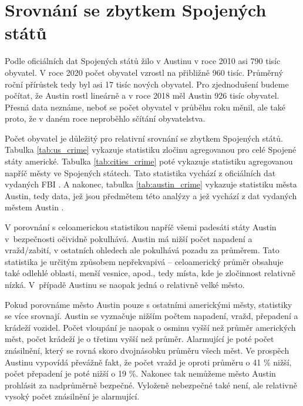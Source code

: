 \documentclass{article}
\begin{document}
\clearpage

\section{Srovnání se zbytkem Spojených států}

Podle oficiálních dat Spojených států \cite{austin-census} žilo v Austinu v roce 2010 asi 790 tisíc obyvatel.
V roce 2020 počet obyvatel vzrostl na přibližně 960 tisíc. Průměrný roční přírůstek tedy byl asi 17 tisíc
nových obyvatel. Pro zjednodušení budeme počítat, že Austin rostl lineárně a v roce 2018 měl Austin 926 tisíc
obyvatel. Přesná data neznáme, neboť se počet obyvatel v průběhu roku měnil, ale také proto, že v daném roce
neproběhlo sčítání obyvatelstva.

Počet obyvatel je důležitý pro relativní srovnání se zbytkem Spojených států. Tabulka \ref{tab:us_crime}
vykazuje statistiku zločinu agregovanou pro celé Spojené státy americké. Tabulka \ref{tab:cities_crime} 
poté vykazuje statistiku agregovanou napříč městy ve Spojených státech. Tato statistika vychází z oficiálních
dat vydaných FBI \cite{us-crime-rates}. A nakonec, tabulka \ref{tab:austin_crime} vykazuje statistiku města 
Austin, tedy data, jež jsou předmětem této analýzy a jež vychází z dat vydaných městem Austin \cite{dataset-source}.

V porovnání s celoamerickou statistikou napříč všemi padesáti státy Austin v~bezpečnosti očividně pokulhává.
Austin má nižší počet napadení a vražd/zabití, v ostatních ohledech ale pokulhává pozadu za průměrem. Tato statistika je
určitým způsobem nepřekvapivá -- celoamerický průměr obsahuje také odlehlé oblasti, menší vesnice, apod.,
tedy místa, kde je zločinnost relativně nízká. V~případě Austinu se naopak jedná o relativně velké město.

Pokud porovnáme město Austin pouze s ostatními americkými městy, statistiky se více srovnají. Austin se vyznačuje
nižším počtem napadení, vražd, přepadení a krádeží vozidel. Počet vloupání je naopak o osminu vyšší než průměr
amerických měst, počet krádeží je o třetinu vyšší než průměr. Alarmující je poté počet znásilnění, který se rovná
skoro dvojnásobku průměru všech měst. Ve prospěch Austinu vypovídá převážně fakt, že počet vražd je oproti průměru o 41 \%
nižší, počet přepadení je poté nižší o 19 \%. Nakonec tak nemůžeme město Austin prohlásit za nadprůměrně bezpečné.
Vyloženě nebezpečné také není, ale relativně vysoký počet znásilnění je alarmující.
\end{document}
